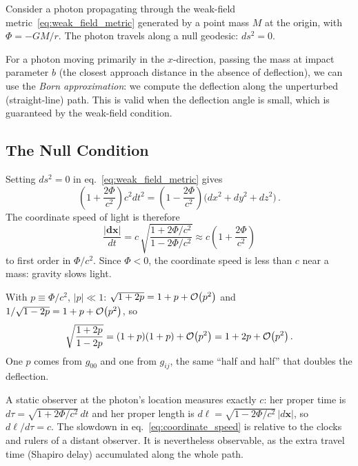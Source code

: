 Consider a photon propagating through the weak-field
metric~\eqref{eq:weak_field_metric} generated by a point mass $M$ at
the origin, with $\Phi = -GM/r$.  The photon travels along a null
geodesic: $ds^2 = 0$.

For a photon moving primarily in the $x$-direction, passing the mass
at impact parameter $b$ (the closest approach distance in the absence
of deflection), we can use the \emph{Born approximation}: we compute
the deflection along the unperturbed (straight-line) path.  This is
valid when the deflection angle is small, which is guaranteed by the
weak-field condition.

\subsection{The Null Condition}

Setting $ds^2 = 0$ in eq.~\eqref{eq:weak_field_metric} gives
\begin{equation}
    \left(1 + \frac{2\Phi}{c^2}\right) c^2 dt^2
    = \left(1 - \frac{2\Phi}{c^2}\right)
    \bigl(dx^2 + dy^2 + dz^2\bigr) \,.
    \label{eq:null_condition}
\end{equation}
The coordinate speed of light is therefore
\begin{equation}
    \frac{|\mathbf{dx}|}{dt}
    = c\,\sqrt{\frac{1 + 2\Phi/c^2}{1 - 2\Phi/c^2}}
    \approx c\left(1 + \frac{2\Phi}{c^2}\right)
    \label{eq:coordinate_speed}
\end{equation}
to first order in $\Phi/c^2$.  Since $\Phi < 0$, the coordinate speed
is less than $c$ near a mass: gravity slows light.

\begin{derivation}
With $p \equiv \Phi/c^2$, $|p| \ll 1$:
$\sqrt{1 + 2p} = 1 + p + \mathcal{O}\!\left(p^2\right)$ and
$1/\sqrt{1 - 2p} = 1 + p + \mathcal{O}\!\left(p^2\right)$, so
\[
\sqrt{\frac{1 + 2p}{1 - 2p}} = (1 + p)(1 + p) + \mathcal{O}\!\left(p^2\right)
= 1 + 2p + \mathcal{O}\!\left(p^2\right) .
\]
One $p$ comes from $g_{00}$ and one from $g_{ij}$, the same ``half and
half'' that doubles the deflection.
\end{derivation}

\begin{annotation}
A static observer at the photon's location measures exactly $c$: her
proper time is $d\tau = \sqrt{1 + 2\Phi/c^2}\,dt$ and her proper length is
$d\ell = \sqrt{1 - 2\Phi/c^2}\,|d\mathbf{x}|$, so
$d\ell/d\tau = c$.  The slowdown in eq.~\eqref{eq:coordinate_speed} is
relative to the clocks and rulers of a distant observer.  It is
nevertheless observable, as the extra travel time (Shapiro delay)
accumulated along the whole path.
\end{annotation}


